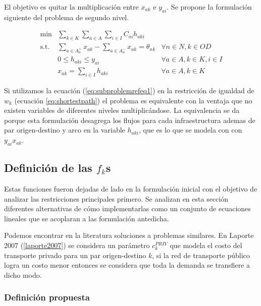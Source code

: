 \documentclass{article}
\begin{document}
  El objetivo es quitar la multiplicación entre $x_{ak}$ e $y_{ai}$. Se propone la formulación siguiente del problema de segundo nivel.

  \begin{align}
    \text{min}  & \sum_{k \in K} \sum_{a \in A} \sum_{i \in I} C_{ai} h_{aki}         & \label{eq:subproblemrefeq1} \\
    \text{s.t.} & \sum_{a \in A_n^+} x_{ak} - \sum_{a \in A_n^-} x_{ak} = \theta_{nk} & \forall n \in N, k \in OD \\
                & 0 \leq h_{aki} \leq y_{ai}                                          & \forall a \in A, k \in K, i \in I \\
                & x_{ak} = \sum_{i \in I} h_{aki}                                     & \forall a \in A, k \in K
  \end{align}

  Si utilizamos la ecuación (\ref{eq:subproblemrefeq1}) en la restricción de igualdad de $w_k$ (ecuación \ref{eq:shortestpath}) el problema es equivalente con la ventaja que no existen variables de diferentes niveles multiplicándose. La equivalencia se da porque esta formulación desagrega los flujos para cada infraestructura ademas de par origen-destino y arco en la variable $h_{aki}$, que es lo que se modela con con $y_{ai} x_{ak}$.

  \subsection*{Definición de las $f_k$s}

  Estas funciones fueron dejadas de lado en la formulación inicial con el objetivo de analizar las restricciones principales primero. Se analizan en esta sección diferentes alternativas de cómo implementarlas como un conjunto de ecuaciones lineales que se acoplaran a las formulación antedicha.

  Podemos encontrar en la literatura soluciones a problemas similares. En Laporte 2007 (\ref{laporte2007}) se considera un parámetro $c^{PRIV}_k$ que modela el costo del transporte privado para un par origen-destino $k$, si la red de transporte público logra un costo menor entonces se considera que toda la demanda se transfiere a dicho modo.

  \subsubsection*{Definición propuesta}
\end{document}
